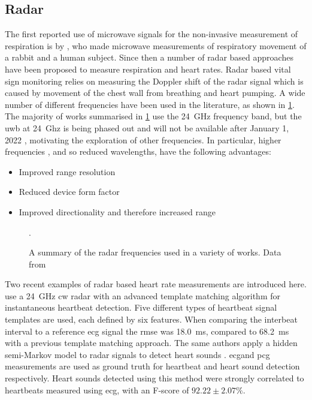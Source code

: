 \documentclass[11pt, parskip=half*,twoside=false]{scrbook}
\begin{document}
\subsection{Radar}
The first reported use of microwave signals for the non-invasive measurement of respiration is by \citet{linNoninvasiveMicrowaveMeasurement1975}, who made microwave measurements of respiratory movement of a rabbit and a human subject. Since then a number of radar based approaches have been proposed to measure respiration and heart rates. Radar based vital sign monitoring relies on measuring the Doppler shift of the radar signal which is caused by movement of the chest wall from breathing and heart pumping. A wide number of different frequencies have been used in the literature, as shown in \cref{fig:radar_freqs}. The majority of works summarised in \cref{fig:radar_freqs} use the 24~GHz frequency band, but the \gls{uwb} at 24~Ghz is being phased out and will not be available after January 1, 2022 \citep{ramasubramanianMovingLegacy242018}, motivating the exploration of other frequencies. In particular, higher frequencies , and so reduced wavelengths, have the following advantages: 
\begin{itemize}
	\item Improved range resolution
	\item Reduced device form factor
	\item Improved directionality and therefore increased range
\end{itemize}

\begin{figure}[h]
	\centering
	
	\caption{A summary of the radar frequencies used in a variety of works. Data from \citet{singhMultiResidentNonContactVital2021}}.
	\label{fig:radar_freqs}
\end{figure}

Two recent examples of radar based heart rate measurements are introduced here.  \citet{willAdvancedTemplateMatching2017} use a 24~GHz \gls{cw} radar with an advanced template matching algorithm for instantaneous heartbeat detection. Five different types of heartbeat signal templates are used, each defined by six features. When comparing the interbeat interval to a reference \gls{ecg} signal the \gls{rmse} was 18.0~ms, compared to 68.2~ms with a previous template matching approach. The same authors apply a hidden semi-Markov model to radar signals to detect heart sounds \citep{willRadarBasedHeartSound2018}. \gls{ecg}and \gls{pcg} measurements are used as ground truth for heartbeat and heart sound detection respectively. Heart sounds detected using this method were strongly correlated to heartbeats measured using \gls{ecg}, with an F-score of $92.22\pm 2.07 \%$.
\end{document}
